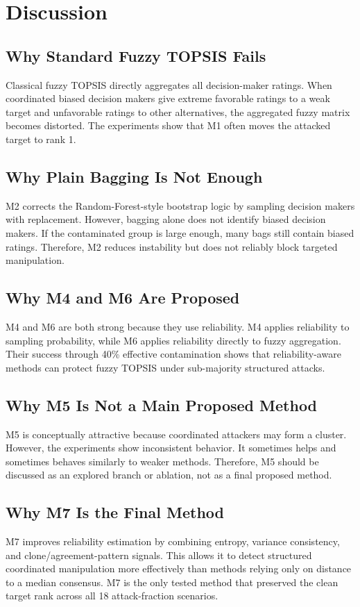 \chapter{Discussion}

\section{Why Standard Fuzzy TOPSIS Fails}
Classical fuzzy TOPSIS directly aggregates all decision-maker ratings. When coordinated biased decision makers give extreme favorable ratings to a weak target and unfavorable ratings to other alternatives, the aggregated fuzzy matrix becomes distorted. The experiments show that M1 often moves the attacked target to rank 1.

\section{Why Plain Bagging Is Not Enough}
M2 corrects the Random-Forest-style bootstrap logic by sampling decision makers with replacement. However, bagging alone does not identify biased decision makers. If the contaminated group is large enough, many bags still contain biased ratings. Therefore, M2 reduces instability but does not reliably block targeted manipulation.

\section{Why M4 and M6 Are Proposed}
M4 and M6 are both strong because they use reliability. M4 applies reliability to sampling probability, while M6 applies reliability directly to fuzzy aggregation. Their success through 40\% effective contamination shows that reliability-aware methods can protect fuzzy TOPSIS under sub-majority structured attacks.

\section{Why M5 Is Not a Main Proposed Method}
M5 is conceptually attractive because coordinated attackers may form a cluster. However, the experiments show inconsistent behavior. It sometimes helps and sometimes behaves similarly to weaker methods. Therefore, M5 should be discussed as an explored branch or ablation, not as a final proposed method.

\section{Why M7 Is the Final Method}
M7 improves reliability estimation by combining entropy, variance consistency, and clone/agreement-pattern signals. This allows it to detect structured coordinated manipulation more effectively than methods relying only on distance to a median consensus. M7 is the only tested method that preserved the clean target rank across all 18 attack-fraction scenarios.

